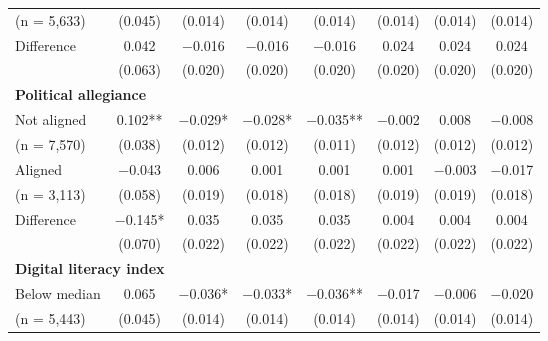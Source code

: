 \documentclass[letterpaper, 12pt, parskip=full,DIV=10]{scrartcl}
\begin{document}
\begin{table}[H]
{\begin{tabular}{lccccccc}
\hspace{1.5em}  (n = 5,633)	&	(\num{0.045})	&	(\num{0.014})	&	(\num{0.014})	&	(\num{0.014})	&	(\num{0.014})	&	(\num{0.014})	&	(\num{0.014})\\
\cmidrule(lr){2-8}														
\hspace{1em} Difference	&	\num{0.042}	&	\num{-0.016}	&	\num{-0.016}	&	\num{-0.016}	&	\num{0.024}	&	\num{0.024}	&	\num{0.024}\\
\hspace{1.5em}	&	(\num{0.063})	&	(\num{0.020})	&	(\num{0.020})	&	(\num{0.020})	&	(\num{0.020})	&	(\num{0.020})	&	(\num{0.020})\\
\multicolumn{4}{l}{\textbf{Political allegiance}} \rule{0pt}{1.2\normalbaselineskip}\\														
\hspace{1em} Not aligned	&	\num{0.102}**	&	\num{-0.029}*	&	\num{-0.028}*	&	\num{-0.035}**	&	\num{-0.002}	&	\num{0.008}	&	\num{-0.008}\\
\hspace{1.5em} (n = 7,570)	&	(\num{0.038})	&	(\num{0.012})	&	(\num{0.012})	&	(\num{0.011})	&	(\num{0.012})	&	(\num{0.012})	&	(\num{0.012})\\
\hspace{1em} Aligned	&	\num{-0.043}	&	\num{0.006}	&	\num{0.001}	&	\num{0.001}	&	\num{0.001}	&	\num{-0.003}	&	\num{-0.017}\\
\hspace{1.5em} (n = 3,113)	&	(\num{0.058})	&	(\num{0.019})	&	(\num{0.018})	&	(\num{0.018})	&	(\num{0.019})	&	(\num{0.019})	&	(\num{0.018})\\
\cmidrule(lr){2-8}														
\hspace{1em} Difference	&	\num{-0.145}*	&	\num{0.035}	&	\num{0.035}	&	\num{0.035}	&	\num{0.004}	&	\num{0.004}	&	\num{0.004}\\
\hspace{1.5em}	&	(\num{0.070})	&	(\num{0.022})	&	(\num{0.022})	&	(\num{0.022})	&	(\num{0.022})	&	(\num{0.022})	&	(\num{0.022})\\
\multicolumn{4}{l}{\textbf{Digital literacy index }}  \rule{0pt}{1.2\normalbaselineskip}\\														
\hspace{1em} Below median	&	\num{0.065}	&	\num{-0.036}*	&	\num{-0.033}*	&	\num{-0.036}**	&	\num{-0.017}	&	\num{-0.006}	&	\num{-0.020}\\
\hspace{1.5em}  (n = 5,443)	&	(\num{0.045})	&	(\num{0.014})	&	(\num{0.014})	&	(\num{0.014})	&	(\num{0.014})	&	(\num{0.014})	&	(\num{0.014})\\

\end{tabular}}
\end{table}
\end{document}
